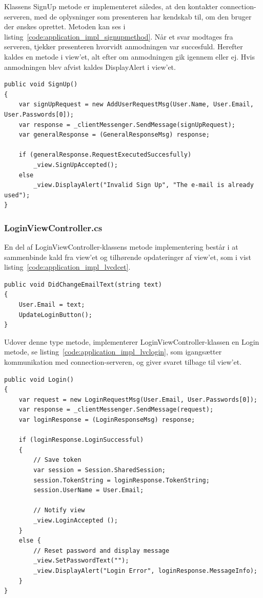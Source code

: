 Klassens SignUp metode er implementeret således, at den kontakter connection-serveren, med de oplysninger som presenteren har kendskab til, om den bruger der ønskes oprettet. Metoden kan ses i listing~\ref{code:application_impl_signupmethod}. Når et svar modtages fra serveren, tjekker presenteren hvorvidt anmodningen var succesfuld. Herefter kaldes en metode i view'et, alt efter om anmodningen gik igennem eller ej. Hvis anmodningen blev afvist kaldes DisplayAlert i view'et.

\begin{lstlisting}[caption={SignUp()},label={code:application_impl_signupmethod}]
public void SignUp()
{
	var signUpRequest = new AddUserRequestMsg(User.Name, User.Email, User.Passwords[0]);
	var response = _clientMessenger.SendMessage(signUpRequest);
	var generalResponse = (GeneralResponseMsg) response;

	if (generalResponse.RequestExecutedSuccesfully)
		_view.SignUpAccepted();
	else
		_view.DisplayAlert("Invalid Sign Up", "The e-mail is already used");
}
\end{lstlisting}

\subsubsection{LoginViewController.cs}
En del af LoginViewController-klassens metode implementering består i at sammenbinde kald fra view'et og tilhørende opdateringer af view'et, som i vist listing~\ref{code:application_impl_lvcdcet}.

\begin{lstlisting}[caption={DidChangeEmailText(...)},label={code:application_impl_lvcdcet}]
public void DidChangeEmailText(string text)
{
	User.Email = text;
	UpdateLoginButton();
}
\end{lstlisting}

Udover denne type metode, implementerer LoginViewController-klassen en Login metode, se listing~\ref{code:application_impl_lvclogin}, som igangsætter kommunikation med connection-serveren, og giver svaret tilbage til view'et. 

\begin{lstlisting}[caption={Login()},label={code:application_impl_lvclogin}]
 public void Login()
{
	var request = new LoginRequestMsg(User.Email, User.Passwords[0]);
	var response = _clientMessenger.SendMessage(request);
	var loginResponse = (LoginResponseMsg) response;

	if (loginResponse.LoginSuccessful)
	{
		// Save token
		var session = Session.SharedSession;
		session.TokenString = loginResponse.TokenString;
		session.UserName = User.Email;

		// Notify view
		_view.LoginAccepted (); 
	}
	else {
		// Reset password and display message
		_view.SetPasswordText("");
		_view.DisplayAlert("Login Error", loginResponse.MessageInfo);
	}
}
\end{lstlisting}

